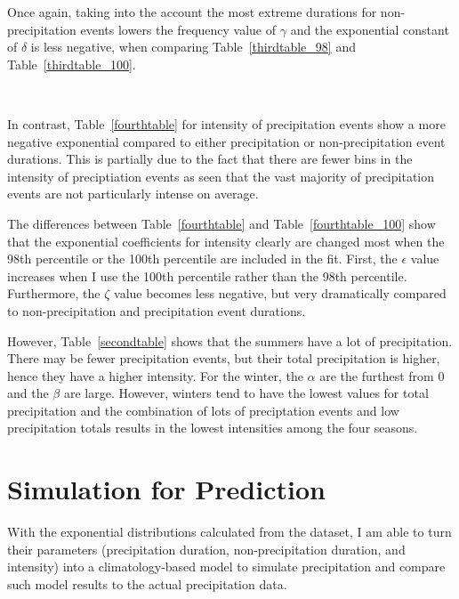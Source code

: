 \documentclass[11pt]{report}
\begin{document}
Once again, taking into the account the most extreme durations for
non-precipitation events lowers the frequency value of $\gamma$ and the
exponential constant of $\delta$ is less negative, when comparing
Table~\ref{thirdtable_98} and Table~\ref{thirdtable_100}.

\





In contrast, Table~\ref{fourthtable} for intensity of precipitation events
show a more negative exponential compared to either precipitation or
non-precipitation event durations. This is partially due to the fact that
there are fewer bins in the intensity of preciptiation events as seen that
the vast majority of precipitation events are not particularly intense on
average.

The differences between Table~\ref{fourthtable} and
Table~\ref{fourthtable_100} show that the exponential coefficients for
intensity clearly are changed most when the 98th percentile or the 100th
percentile are included in the fit. First, the $\epsilon$ value increases
when I use the 100th percentile rather than the 98th
percentile. Furthermore, the $\zeta$ value becomes less
negative, but very dramatically compared to non-precipitation and
precipitation event durations.

However, Table~\ref{secondtable} shows that the summers have a lot of
precipitation. There may be fewer precipitation events, but their total
precipitation is higher, hence they have a higher intensity.  For the
winter, the $\alpha$ are the furthest from 0 and the $\beta$ are
large. However, winters tend to have the lowest values for total
precipitation and the combination of lots of preciptation events and low
precipitation totals results in the lowest intensities among the four
seasons.


\clearpage

\section{Simulation for Prediction}\label{sec:sfp}

With the exponential distributions calculated from the dataset, I am able
to turn their parameters (precipitation duration, non-precipitation
duration, and intensity) into a climatology-based model to simulate
precipitation and compare such model results to the actual precipitation
data.
\end{document}
